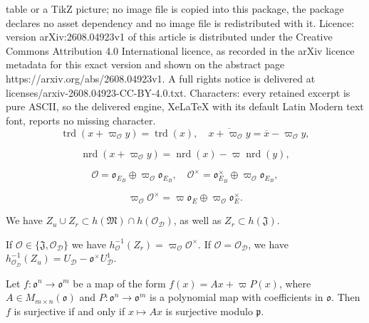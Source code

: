\documentclass[10pt,a4paper]{amsart}
\DeclareMathOperator{\nrd}{nrd}
\DeclareMathOperator{\trd}{trd}
\newcommand{\D}{\mathcal{D}}
\newcommand{\J}{\mathfrak{J}}
\newcommand{\M}{\mathfrak{M}}
\newcommand{\p}{\mathfrak{p}}
\renewcommand{\O}{\mathcal{O}}
\renewcommand{\o}{\mathfrak{o}}
\begin{document}
table or a TikZ picture; no image file is copied into this package, the package declares no asset dependency and no image file is redistributed with it. Licence: version arXiv:2608.04923v1 of this article is distributed under the Creative Commons Attribution 4.0 International licence, as recorded in the arXiv licence metadata for this exact version and shown on the abstract page https://arxiv.org/abs/2608.04923v1. A full rights notice is delivered at licenses/arxiv-2608.04923-CC-BY-4.0.txt. Characters: every retained excerpt is pure ASCII, so the delivered engine, XeLaTeX with its default Latin Modern text font, reports no missing character.
\begin{equation}\label{eq:tracecyclicalgebra}
    \trd(x + \varpi_\O y) = \trd(x),\quad 
    \overline{x + \varpi_\O y} = \overline{x} - \varpi_\O y,
\end{equation}

\begin{equation}\label{eq:normcyclicalgebra}
    \nrd(x + \varpi_\O y) = \nrd(x) -\varpi \nrd(y),
\end{equation}

\begin{equation}\label{eq:descriptionordercyclicpart1}
    \O = \o_{E_B} \oplus \varpi_\O \o_{E_B}, \quad \O^\times = \o_{E_B}^\times \oplus \varpi_\O \o_{E_B},
\end{equation}

\begin{equation}\label{auxeq:descriptionuniformizers}
\varpi_\O \O^\times = \varpi \o_E \oplus \varpi_\O \o_{E}^\times.
\end{equation} 

\begin{lem}\label{lem:imageofhhereditaryorders}
We have $Z_u \cup Z_r \subset h(\M)\cap h(\O_\D)$, as well as $Z_r \subset h(\J)$.
\end{lem}

\begin{lem}\label{lem:preimagesramifiedunramified}
If $\O \in \{\J, \O_\D\}$ we have $h_\O^{-1}(Z_r) = \varpi_\O \O^\times$. If $\O = \O_\D$, we have $h_{\O_\D}^{-1}(Z_u) = U_\D - \o^\times U_\D^1$. 
\end{lem}

\begin{lem}\label{lem:auxiliaryhensel}
Let $f: \o^n \rightarrow \o^m$ be a map of the form $f(x) = Ax + \varpi P(x)$, where $A \in M_{m \times n}(\o)$ and $P: \o^n \rightarrow \o^m$ is a polynomial map with coefficients in $\o$. Then $f$ is surjective if and only if $x\mapsto Ax$ is surjective modulo $\p$.
\end{lem}
\end{document}
